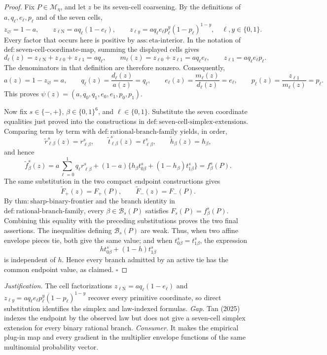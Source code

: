 \documentclass{article}
\begin{document}
\begin{proof}
Fix \(P\in\mathcal M_\eta\), and let \(z\) be its seven-cell coarsening.  By the definitions of \(a,q_\ell,e_\ell,p_\ell\) and of the seven cells,
\[
 z_\varnothing=1-a,
 \qquad
 z_{\ell\mathrm N}=a q_\ell(1-e_\ell),
 \qquad
 z_{\ell y}=a q_\ell e_\ell p_\ell^y(1-p_\ell)^{1-y},
 \quad \ell,y\in\{0,1\}.
\]
Every factor that occurs here is positive by \(\mathrm{ass{:}eta\text{-}interior}\).  In the notation of \(\mathrm{def{:}seven\text{-}cell\text{-}coordinate\text{-}map}\), summing the displayed cells gives
\[
 d_\ell(z)=z_{\ell\mathrm N}+z_{\ell0}+z_{\ell1}=a q_\ell,
 \qquad
 m_\ell(z)=z_{\ell0}+z_{\ell1}=a q_\ell e_\ell,
 \qquad
 z_{\ell1}=a q_\ell e_\ell p_\ell.
\]
The denominators in that definition are therefore nonzero.  Consequently,
\[
 a(z)=1-z_\varnothing=a,
 \qquad
 q_\ell(z)=\frac{d_\ell(z)}{a(z)}=q_\ell,
 \qquad
 e_\ell(z)=\frac{m_\ell(z)}{d_\ell(z)}=e_\ell,
 \qquad
 p_\ell(z)=\frac{z_{\ell1}}{m_\ell(z)}=p_\ell.
\]
This proves \(\psi(z)=(a,q_0,q_1,e_0,e_1,p_0,p_1)\).

Now fix \(s\in\{-,+\}\), \(\beta\in\{0,1\}^6\), and \(\ell\in\{0,1\}\).  Substitute the seven coordinate equalities just proved into the constructions in \(\mathrm{def{:}seven\text{-}cell\text{-}simplex\text{-}extensions}\).  Comparing term by term with \(\mathrm{def{:}rational\text{-}branch\text{-}family}\) yields, in order,
\[
 \widetilde r_{\ell\beta}^s(z)=r_{\ell\beta}^s,
 \qquad
 \widetilde t_{\ell\beta}^s(z)=t_{\ell\beta}^s,
 \qquad
 \widetilde h_\beta(z)=h_\beta,
\]
and hence
\[
 \widetilde f_\beta^s(z)
 =a\sum_{\ell=0}^1q_\ell r_{\ell\beta}^s
 +(1-a)\{h_\beta t_{0\beta}^s+(1-h_\beta)t_{1\beta}^s\}
 =f_\beta^s(P).
\]
The same substitution in the two compact endpoint constructions gives
\[
 \widetilde F_+(z)=F_+(P),
 \qquad
 \widetilde F_-(z)=F_-(P).
\]
By \(\mathrm{thm{:}sharp\text{-}binary\text{-}frontier}\) and the branch identity in \(\mathrm{def{:}rational\text{-}branch\text{-}family}\), every \(\beta\in\mathcal B_s(P)\) satisfies \(F_s(P)=f_\beta^s(P)\).  Combining this equality with the preceding substitutions proves the two final assertions.  The inequalities defining \(\mathcal B_s(P)\) are weak.  Thus, when two affine envelope pieces tie, both give the same value; and when \(t_{0\beta}^s=t_{1\beta}^s\), the expression
\[
 h t_{0\beta}^s+(1-h)t_{1\beta}^s
\]
is independent of \(h\).  Hence every branch admitted by an active tie has the common endpoint value, as claimed. \(\square\)
\end{proof}
\par\smallskip\noindent \textit{Justification.} The cell factorizations \(z_{\ell\mathrm N}=a q_\ell(1-e_\ell)\) and \(z_{\ell y}=a q_\ell e_\ell p_\ell^y(1-p_\ell)^{1-y}\) recover every primitive coordinate, so direct substitution identifies the simplex and law-indexed formulas. \textit{Gap.} Tan (2025) indexes the endpoint by the observed law but does not give a seven-cell simplex extension for every binary rational branch. \textit{Consumer.} It makes the empirical plug-in map and every gradient in the multiplier envelope functions of the same multinomial probability vector.
\end{document}
